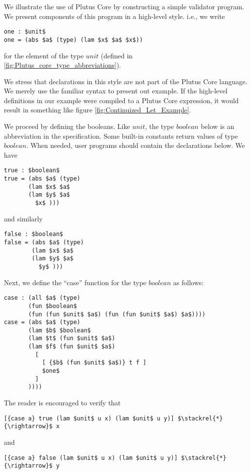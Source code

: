 \documentclass[../plutus-core-specification.tex]{subfiles}
\begin{document}
We illustrate the use of Plutus Core by constructing a simple validator program. We present components of this program in a high-level style. i.e., we write
\begin{lstlisting}[basicstyle=\ttfamily,mathescape]
one : $unit$
one = (abs $a$ (type) (lam $x$ $a$ $x$))
\end{lstlisting}
for the element of the type $unit$ (defined in \ref{fig:Plutus_core_type_abbreviations}).

We stress that declarations in this style are not part of the Plutus Core language. We merely use the familiar syntax to present out example. If the high-level definitions in our example were compiled to a Plutus Core expression, it would result in something like figure \ref{fig:Continuized_Let_Example}.

We proceed by defining the booleans. Like $unit$, the type $boolean$ below is an abbreviation in the specification. Some built-in constants return values of type $boolean$. When needed, user programs should contain the declarations below. We have
\begin{lstlisting}[basicstyle=\ttfamily,mathescape]
true : $boolean$
true = (abs $a$ (type)
       (lam $x$ $a$
       (lam $y$ $a$
         $x$ )))
\end{lstlisting}
and similarly
\begin{lstlisting}[basicstyle=\ttfamily,mathescape]
false : $boolean$
false = (abs $a$ (type)
        (lam $x$ $a$
        (lam $y$ $a$
          $y$ )))
\end{lstlisting}

Next, we define the ``case'' function for the type $boolean$ as follows:
\begin{lstlisting}[basicstyle=\ttfamily,mathescape]
case : (all $a$ (type)
       (fun $boolean$
       (fun (fun $unit$ $a$) (fun (fun $unit$ $a$) $a$))))
case = (abs $a$ (type)
       (lam $b$ $boolean$
       (lam $t$ (fun $unit$ $a$)
       (lam $f$ (fun $unit$ $a$)
         [
           [ {$b$ (fun $unit$ $a$)} t f ]
           $one$
         ]
       ))))
\end{lstlisting}
The reader is encouraged to verify that
\begin{lstlisting}[basicstyle=\ttfamily,mathescape]
[{case a} true (lam $unit$ u x) (lam $unit$ u y)] $\stackrel{*}{\rightarrow}$ x
\end{lstlisting}
and
\begin{lstlisting}[basicstyle=\ttfamily,mathescape]
[{case a} false (lam $unit$ u x) (lam $unit$ u y)] $\stackrel{*}{\rightarrow}$ y
\end{lstlisting}
\end{document}
